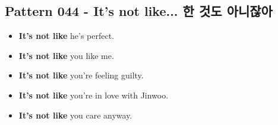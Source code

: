 \documentclass[11pt]{oblivoir}
\begin{document}
\subsection{Pattern 044 - It's not like... \texttildelow 한 것도 아니잖아}
\begin{itemize}
  \item \textbf{It's not like} he's perfect.
  \item \textbf{It's not like} you like me.
  \item \textbf{It's not like} you're feeling guilty.
  \item \textbf{It's not like} you're in love with Jinwoo.
  \item \textbf{It's not like} you care anyway.
\end{itemize}
\end{document}
